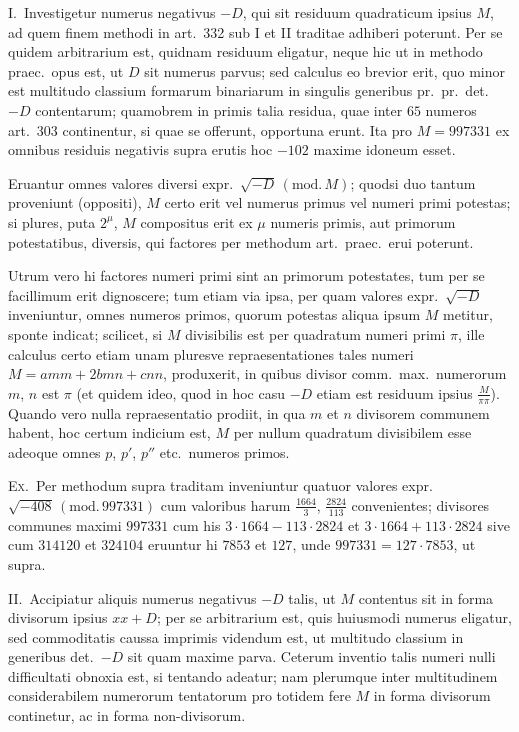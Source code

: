 \documentclass[12pt,a4paper]{article}
\theoremstyle{plain}
\theoremstyle{definition}
\theoremstyle{remark}
\begin{document}
\textsc{I.}\ Investigetur numerus negativus $-D$, qui sit residuum quadraticum ipsius $M$, ad quem finem methodi in art.\ 332 sub I et II traditae adhiberi poterunt. Per se quidem arbitrarium est, quidnam residuum eligatur, neque hic ut in methodo praec.\ opus est, ut $D$ sit numerus parvus; sed calculus eo brevior erit, quo minor est multitudo classium formarum binariarum in singulis generibus pr.\ pr.\ det.\ $-D$ contentarum; quamobrem in primis talia residua, quae inter $65$ numeros art.\ 303 continentur, si quae se offerunt, opportuna erunt. Ita pro $M=997331$ ex omnibus residuis negativis supra erutis hoc $-102$ maxime idoneum esset.

Eruantur omnes valores diversi expr.~$\surd{-D}\,(\mathrm{mod.}\,M)$; quodsi duo tantum proveniunt (oppositi), $M$ certo erit vel numerus primus vel numeri primi potestas; si plures, puta $2^\mu$, $M$ compositus erit ex $\mu$ numeris primis, aut primorum potestatibus, diversis, qui factores per methodum art.\ praec.\ erui poterunt.

Utrum vero hi factores numeri primi sint an primorum potestates, tum per se facillimum erit dignoscere; tum etiam via ipsa, per quam valores expr.~$\surd{-D}$ inveniuntur, omnes numeros primos, quorum potestas aliqua ipsum $M$ metitur, sponte indicat; scilicet, si $M$ divisibilis est per quadratum numeri primi $\pi$, ille calculus certo etiam unam pluresve repraesentationes tales numeri $M=amm+2bmn+cnn$, produxerit, in quibus divisor comm.\ max.\ numerorum $m$, $n$ est $\pi$ (et quidem ideo, quod in hoc casu $-D$ etiam est residuum ipsius $\frac{M}{\pi\pi}$). Quando vero nulla repraesentatio prodiit, in qua $m$ et $n$ divisorem communem habent, hoc certum indicium est, $M$ per nullum quadratum divisibilem esse adeoque omnes $p$, $p'$, $p''$ etc.\ numeros primos.

\textsc{Ex.}\ Per methodum supra traditam inveniuntur quatuor valores expr.~$\surd{-408}\,(\mathrm{mod.}\,997331)$ cum valoribus harum $\frac{1664}{3}$, $\frac{2824}{113}$ convenientes; divisores communes maximi $997331$ cum his $3\cdot 1664-113\cdot 2824$ et $3\cdot 1664+113\cdot 2824$ sive cum $314120$ et $324104$ eruuntur hi $7853$ et $127$, unde $997331=127\cdot 7853$, ut supra.

\textsc{II.}\ Accipiatur aliquis numerus negativus $-D$ talis, ut $M$ contentus sit in forma divisorum ipsius $xx+D$; per se arbitrarium est, quis huiusmodi numerus eligatur, sed commoditatis caussa imprimis videndum est, ut multitudo classium in generibus det.\ $-D$ sit quam maxime parva. Ceterum inventio talis numeri nulli difficultati obnoxia est, si tentando adeatur; nam plerumque inter multitudinem considerabilem numerorum tentatorum pro totidem fere $M$ in forma divisorum continetur, ac in forma non-divisorum.
\end{document}

